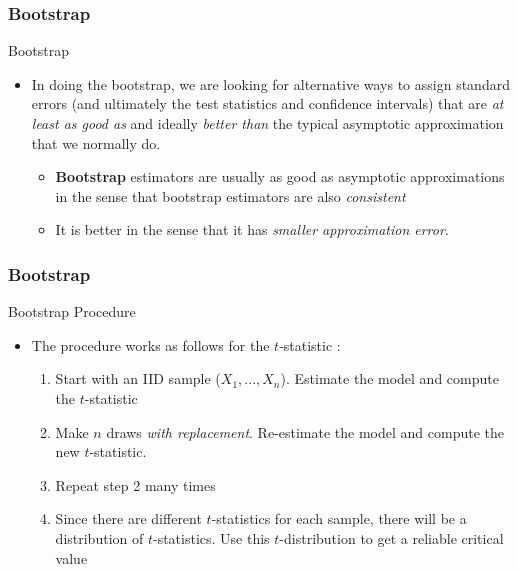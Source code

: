 \documentclass{beamer}
\begin{document}
\begin{frame}
\frametitle{Bootstrap}
Bootstrap
\begin{itemize}
\item In doing the bootstrap, we are looking for alternative ways to assign standard errors (and ultimately the test statistics and confidence intervals) that are \textit{at least as good as} and ideally \textit{better than} the typical asymptotic approximation that we normally do.
\begin{itemize}
\item \textbf{Bootstrap} estimators are usually as good as asymptotic approximations in the sense that bootstrap estimators are also \textit{consistent} 
\item It is better in the sense that it has \textit{smaller approximation error}.
\end{itemize}
\end{itemize}
\end{frame}

\begin{frame}
\frametitle{Bootstrap}
Bootstrap Procedure
\begin{itemize}
\item The procedure works as follows for the $t$-statistic : 
\begin{enumerate}
\item Start with an IID sample ($X_1,...,X_n$). Estimate the model and compute the $t$-statistic
\item Make $n$ draws \textit{with replacement}. Re-estimate the model and compute the new $t$-statistic.
\item Repeat step 2 many times
\item Since there are different $t$-statistics for each sample, there will be a distribution of $t$-statistics. Use this $t$-distribution to get a reliable critical value
\end{enumerate}
\end{itemize}
\end{frame}
\end{document}
